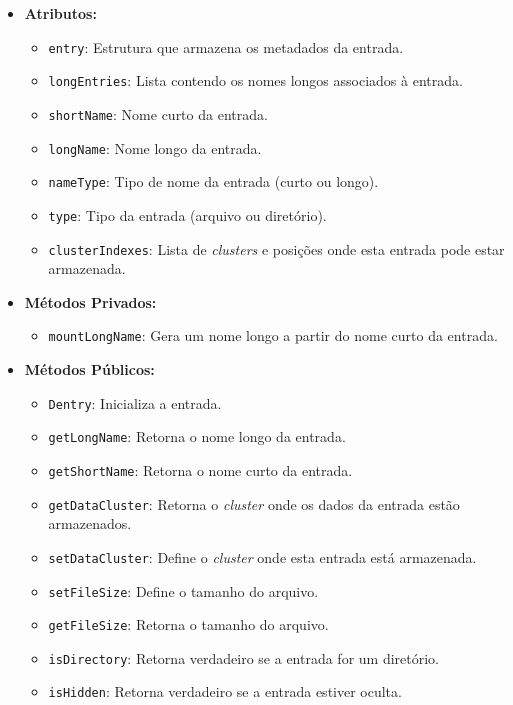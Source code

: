 \documentclass[
    12pt,				%
    oneside,   	        %
    a4paper,			%
    english,			%
    french,				%
    spanish,			%
    brazil,				%
    ]{pacotes/abntex2}
\begin{document}
\begin{itemize}
    \item \textbf{Atributos:}
        \begin{itemize}
            \item \texttt{entry}: Estrutura que armazena os metadados da entrada.
            \item \texttt{longEntries}: Lista contendo os nomes longos associados à entrada.
            \item \texttt{shortName}: Nome curto da entrada.
            \item \texttt{longName}: Nome longo da entrada.
            \item \texttt{nameType}: Tipo de nome da entrada (curto ou longo).
            \item \texttt{type}: Tipo da entrada (arquivo ou diretório).
            \item \texttt{clusterIndexes}: Lista de \textit{clusters} e posições onde esta entrada pode estar armazenada.
        \end{itemize}
    \item \textbf{Métodos Privados:}
        \begin{itemize}
            \item \texttt{mountLongName}: Gera um nome longo a partir do nome curto da entrada.
        \end{itemize}
    \item \textbf{Métodos Públicos:}
        \begin{itemize}
            \item \texttt{Dentry}: Inicializa a entrada.
            \item \texttt{getLongName}: Retorna o nome longo da entrada.
            \item \texttt{getShortName}: Retorna o nome curto da entrada.
            \item \texttt{getDataCluster}: Retorna o \textit{cluster} onde os dados da entrada estão armazenados.
            \item \texttt{setDataCluster}: Define o \textit{cluster} onde esta entrada está armazenada.
            \item \texttt{setFileSize}: Define o tamanho do arquivo.
            \item \texttt{getFileSize}: Retorna o tamanho do arquivo.
            \item \texttt{isDirectory}: Retorna verdadeiro se a entrada for um diretório.
            \item \texttt{isHidden}: Retorna verdadeiro se a entrada estiver oculta.

\end{itemize}
\end{itemize}
\end{document}

